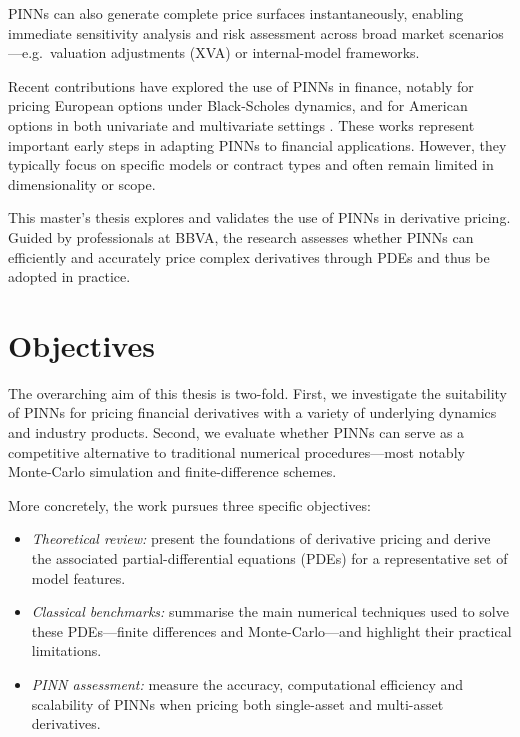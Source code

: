 \documentclass[12pt]{report} %
\theoremstyle{plain} %
\theoremstyle{definition} %
\theoremstyle{remark} %
\begin{document}
PINNs can also generate complete price surfaces instantaneously, enabling immediate sensitivity
analysis and risk assessment across broad market scenarios—e.g.\ valuation adjustments (XVA)
or internal-model frameworks.

Recent contributions have explored the use of PINNs in finance, 
notably for pricing European options under Black-Scholes dynamics, 
and for American options in both univariate and multivariate settings 
\cite{GATTA202368, math9010046}. These works represent important 
early steps in adapting PINNs to financial applications. However, they typically 
focus on specific models or contract types and often remain limited in dimensionality or scope.

This master's thesis explores and validates the use of PINNs in derivative pricing.
Guided by professionals at BBVA, the research assesses whether PINNs can efficiently
and accurately price complex derivatives through PDEs and thus be adopted in practice.


\section{Objectives}

The overarching aim of this thesis is two-fold. 
First, we investigate the suitability of PINNs for pricing
financial derivatives with a variety of underlying dynamics and industry products.
Second, we evaluate whether PINNs can serve as a competitive alternative to traditional
numerical procedures—most notably Monte-Carlo simulation and finite-difference schemes.

More concretely, the work pursues three specific objectives:
\begin{itemize}
 \item \textit{Theoretical review:} present the foundations of derivative pricing and derive the
 associated partial-differential equations (PDEs) for a representative set of model features.
 \item \textit{Classical benchmarks:} summarise the main numerical techniques used to solve
 these PDEs—finite differences and Monte-Carlo—and highlight their
 practical limitations.
 \item \textit{PINN assessment:} measure the accuracy, computational efficiency and scalability
 of PINNs when pricing both single-asset and multi-asset derivatives.
\end{itemize}
\end{document}
